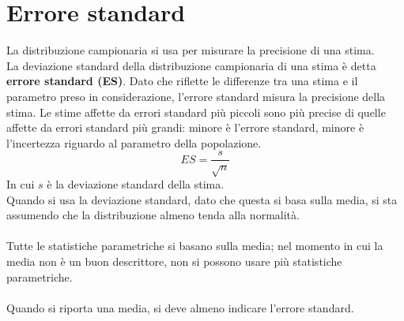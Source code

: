 \documentclass[10pt, draft]{book}
\begin{document}
\section{Errore standard \label{errst}}
La distribuzione campionaria si usa per misurare la precisione di una stima.
\\
La deviazione standard della distribuzione campionaria di una stima è detta \textbf{errore standard (ES)}. Dato che riflette le differenze tra una stima e il parametro preso in considerazione, l'errore standard misura la precisione della stima. Le stime affette da errori standard più piccoli sono più precise di quelle affette da errori standard più grandi: minore è l'errore standard, minore è l'incertezza riguardo al parametro della popolazione. 
\begin{equation}
    ES = \frac{s}{\sqrt{n}}
\end{equation}
In cui $s$ è la deviazione standard della stima.
\\
Quando si usa la deviazione standard, dato che questa si basa sulla media, si sta assumendo che la distribuzione almeno tenda alla normalità.
\\
\\
Tutte le statistiche parametriche si basano sulla media; nel momento in cui la media non è un buon descrittore, non si possono usare più statistiche parametriche.
\\
\\
Quando si riporta una media, si deve almeno indicare l'errore standard.
\end{document}
